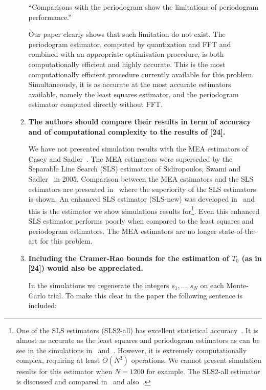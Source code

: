 \documentclass[a4paper,10pt]{article}
\begin{document}
\begin{enumerate}
\begin{enumerate}
``Comparisons with the periodogram show the limitations of periodogram performance.''

Our paper clearly shows that such limitation do not exist.  The periodogram estimator, computed by quantization and FFT and combined with an appropriate optimisation procedure, is both computationally efficient and highly accurate.  This is the most computationally efficient procedure currently available for this problem.  Simultaneously, it is as accurate at the most accurate estimators available, namely the least squares estimator, and the periodogram estimator computed directly without FFT.

\item \textbf{ The authors should
compare their results in term of accuracy and of computational complexity to
the results of [24].}

We have not presented simulation results with the MEA estimators of Casey and Sadler~\cite{536682,726812}.  The MEA estimators were superseded by the Separable Line Search (SLS) estimators of Sidiropoulos, Swami and Sadler~\cite{Sidiropoulos2005} in 2005.  Comparison between the MEA estimators and the SLS estimators are presented in~\cite{Sidiropoulos2005} where the superiority of the SLS estimators is shown.  An enhanced SLS estimator (SLS-new) was developed in~\cite{Clarkson2007} and this is the estimator we show simulations results for\footnote{One of the SLS estimators (SLS2-all) has excellent statistical accuracy~\cite{Sidiropoulos2005}.  It is almost as accurate as the least squares and periodogram estimators as can be see in the simulations in~\cite{Clarkson2007} and~\cite{McKilliam2007}.  However, it is extremely computationally complex, requiring at least $O(N^3)$ operations.  We cannot present simulation results for this estimator when $N=1200$ for example.  The SLS2-all estimator is discussed and compared in~\cite{Sidiropoulos2005} and also~\cite{Clarkson2007,McKilliam2007}.}.  Even this enhanced SLS estimator performs poorly when compared to the least squares and periodogram estimators.  The MEA estimators are no longer state-of-the-art for this problem.

\item \textbf{Including the Cramer-Rao bounds for the estimation of $T_0$
(as in [24]) would also be appreciated.}

In the simulations we regenerate the integers $s_1,\dots,s_N$ on each Monte-Carlo trial.  To make this clear in the paper the following sentence is included:


\end{enumerate}
\end{enumerate}
\end{document}
